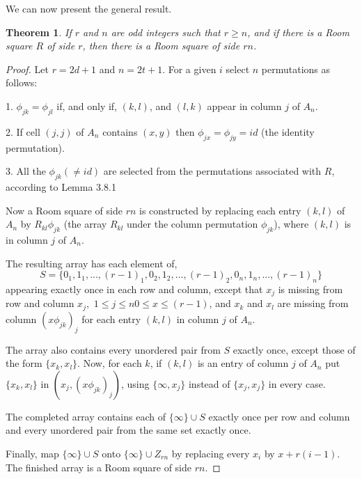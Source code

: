 \documentclass[
  11pt,
  a4paper]{book}
\newtheorem{theorem}{Theorem}
\begin{document}
We can now present the general result.

\begin{theorem}
If $r$ and $n$ are odd integers such that $r \geq n$, and if
there is a Room square $R$ of side $r$, then there is a Room
square of side $rn$.
\end{theorem}

\begin{proof}
Let $r=2d+1$ and $n=2t+1$.
For a given $i$ select $n$ permutations as follows:

1.  $\phi _{jk} = \phi _{jl}$ if, and only if, $(k,l)$, and $(l,k)$
    appear in column $j$ of $A_n$.

2.  If cell $(j,j)$ of $A_n$ contains $(x,y)$ then
    $\phi _{jx}=\phi _{jy}=id$ (the identity permutation).

3.  All the $\phi _{jk} (\neq id)$ are selected from the permutations
    associated with $R$, according to Lemma 3.8.1

Now a Room square of side $rn$ is constructed by replacing
each entry $(k,l)$ of $A_n$ by $R_{kl} \phi _{jk}$ (the
array $R_{kl}$ under the column permutation $\phi _{jk}$),
where $(k,l)$ is in column $j$ of $A_n$.

The resulting array has each element of,
$$S = \{0_1,1_1,...,(r-1)_1,0_2,1_2,...,(r-1)_2,0_n,1_n,...,(r-1)_n\}$$
appearing exactly once in each row and column, except that
$x_j$ is missing from row and column
$x_j,$ $1 \leq j \leq n 0 \leq x \leq (r-1)$, and $x_k$ and
$x_l$ are missing from column $(x \phi _{jk})_j$ for each
entry $(k,l)$ in column $j$ of $A_n$.

The array also contains every unordered pair from $S$
exactly once, except those of the form $\{x_k,x_l\}$.  Now,
for each $k$, if $(k, l)$ is an entry of column $j$ of $A_n$
put $\{x_k, x_l\}$ in $(x_j, (x \phi _{jk})_j)$, using
$\{\infty, x_j\}$ instead of $\{x_j, x_j\}$ in every case.

The completed array contains each of $\{\infty\} \cup S$
exactly once per row and column and every unordered pair
from the same set exactly once.

Finally, map $\{\infty\} \cup S$ onto
$\{\infty \} \cup Z_{rn}$ by replacing every $x_i$ by
$x + r(i - 1)$. The finished array is a Room square
of side $rn$.
\end{proof}
\end{document}
